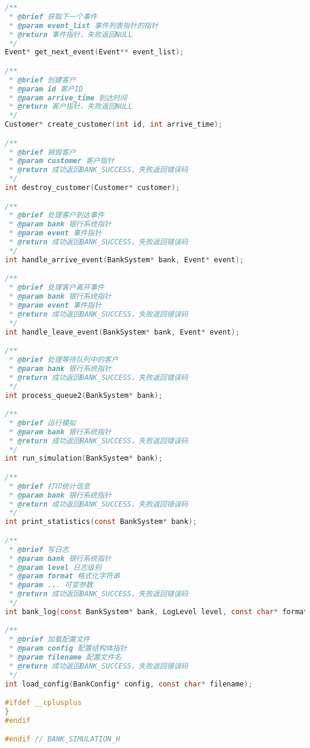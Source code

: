 \documentclass[12pt,a4paper]{article}
\begin{document}
\begin{lstlisting}[language=C,caption=bank\_simulation.h]
/**
 * @brief 获取下一个事件
 * @param event_list 事件列表指针的指针
 * @return 事件指针，失败返回NULL
 */
Event* get_next_event(Event** event_list);

/**
 * @brief 创建客户
 * @param id 客户ID
 * @param arrive_time 到达时间
 * @return 客户指针，失败返回NULL
 */
Customer* create_customer(int id, int arrive_time);

/**
 * @brief 销毁客户
 * @param customer 客户指针
 * @return 成功返回BANK_SUCCESS，失败返回错误码
 */
int destroy_customer(Customer* customer);

/**
 * @brief 处理客户到达事件
 * @param bank 银行系统指针
 * @param event 事件指针
 * @return 成功返回BANK_SUCCESS，失败返回错误码
 */
int handle_arrive_event(BankSystem* bank, Event* event);

/**
 * @brief 处理客户离开事件
 * @param bank 银行系统指针
 * @param event 事件指针
 * @return 成功返回BANK_SUCCESS，失败返回错误码
 */
int handle_leave_event(BankSystem* bank, Event* event);

/**
 * @brief 处理等待队列中的客户
 * @param bank 银行系统指针
 * @return 成功返回BANK_SUCCESS，失败返回错误码
 */
int process_queue2(BankSystem* bank);

/**
 * @brief 运行模拟
 * @param bank 银行系统指针
 * @return 成功返回BANK_SUCCESS，失败返回错误码
 */
int run_simulation(BankSystem* bank);

/**
 * @brief 打印统计信息
 * @param bank 银行系统指针
 * @return 成功返回BANK_SUCCESS，失败返回错误码
 */
int print_statistics(const BankSystem* bank);

/**
 * @brief 写日志
 * @param bank 银行系统指针
 * @param level 日志级别
 * @param format 格式化字符串
 * @param ... 可变参数
 * @return 成功返回BANK_SUCCESS，失败返回错误码
 */
int bank_log(const BankSystem* bank, LogLevel level, const char* format, ...);

/**
 * @brief 加载配置文件
 * @param config 配置结构体指针
 * @param filename 配置文件名
 * @return 成功返回BANK_SUCCESS，失败返回错误码
 */
int load_config(BankConfig* config, const char* filename);

#ifdef __cplusplus
}
#endif

#endif // BANK_SIMULATION_H
\end{lstlisting}
\end{document}
